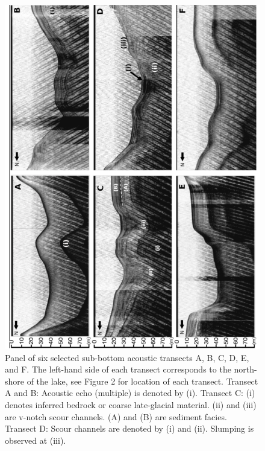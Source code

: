 \documentclass[Royal,times,doublespace,sageh]{sagej}
\begin{document}
\begin{figure}

{\centering \includegraphics[width=1\linewidth]{figs/acoustics_6_panel} 

}

\caption{Panel of six selected sub-bottom acoustic transects A, B, C, D, E, and F. The left-hand side of each transect corresponds to the north-shore of the lake, see Figure 2 for location of each transect. Transect A and B: Acoustic echo (multiple) is denoted by (i). Transect C: (i) denotes inferred bedrock or coarse late-glacial material. (ii) and (iii) are v-notch scour channels. (A) and (B) are sediment facies. Transect D: Scour channels are denoted by (i) and (ii). Slumping is observed at (iii).}\label{fig:acoustics}
\end{figure}
\end{document}
